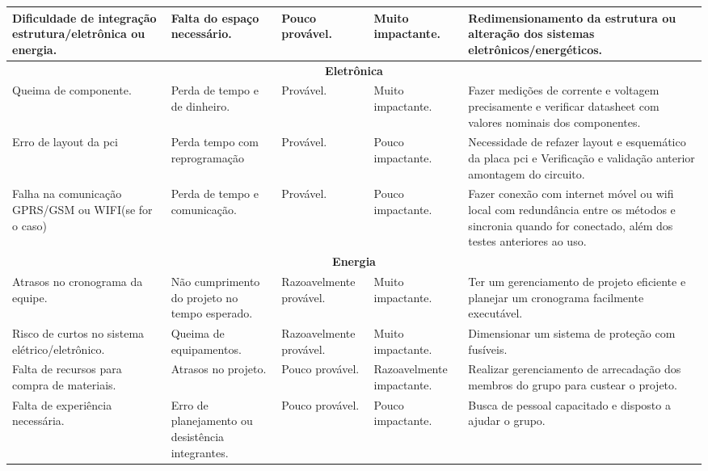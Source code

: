 \begin{longtable}{|m{2.8cm}|m{4cm}|m{2.5cm}|m{2.2cm}|m{4cm}|}
Dificuldade de integração estrutura/eletrônica ou energia. & Falta do espaço necessário.                                                                          & Pouco provável.         & Muito impactante.         & Redimensionamento da estrutura ou alteração dos sistemas eletrônicos/energéticos.                                 \\ \hline

\multicolumn{5}{|c|}{\textbf{Eletrônica}}\tabularnewline
\hline

Queima de componente. & Perda de tempo e de dinheiro. & Provável. & Muito impactante. & Fazer medições de corrente e voltagem precisamente e verificar datasheet com valores nominais dos componentes. \\ \hline

Erro de layout da pci & Perda tempo com reprogramação & Provável. & Pouco impactante. & Necessidade de refazer layout e esquemático da placa pci e Verificação e validação anterior amontagem do circuito. \\ \hline

Falha na comunicação GPRS/GSM ou WIFI(se for o caso) & Perda de tempo e comunicação. & Provável. & Pouco impactante. & Fazer conexão com internet móvel ou wifi local com redundância entre os métodos e sincronia quando for conectado, além dos testes anteriores ao uso. \\ \hline

\multicolumn{5}{|c|}{\textbf{Energia}}\tabularnewline
\hline

Atrasos no cronograma da equipe. & Não cumprimento do projeto no tempo esperado.                      & Razoavelmente provável. & Muito impactante. & Ter um gerenciamento de projeto eficiente e planejar um cronograma facilmente executável. \\ \hline

Risco de curtos no sistema elétrico/eletrônico. & Queima de equipamentos. & Razoavelmente provável. & Muito impactante. & Dimensionar um sistema de proteção com fusíveis.\\ \hline

Falta de recursos para compra de materiais. & Atrasos no projeto. & Pouco provável. & Razoavelmente impactante. & Realizar gerenciamento de arrecadação dos membros do grupo para custear o projeto. \\ \hline

Falta de experiência necessária. & Erro de planejamento ou desistência integrantes. & Pouco provável. & Pouco impactante. & Busca de pessoal capacitado e disposto a ajudar o grupo. \\ \hline


\end{longtable}
